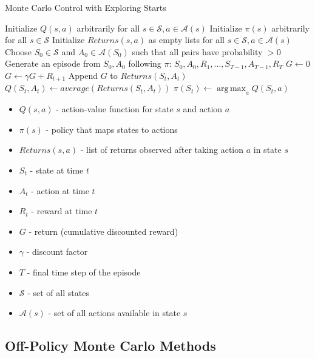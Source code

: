 \documentclass[11pt,a4paper]{article}
\DeclareMathOperator*{\argmax}{arg\,max}
\begin{document}
\begin{algorithm}[H]
\caption{Monte Carlo Control with Exploring Starts}
\begin{algorithmic}[1]
\State Initialize $Q(s, a)$ arbitrarily for all $s \in \mathcal{S}, a \in \mathcal{A}(s)$
\State Initialize $\pi(s)$ arbitrarily for all $s \in \mathcal{S}$
\State Initialize $Returns(s, a)$ as empty lists for all $s \in \mathcal{S}, a \in \mathcal{A}(s)$
    \State Choose $S_0 \in \mathcal{S}$ and $A_0 \in \mathcal{A}(S_0)$ such that all pairs have probability $> 0$
    \State Generate an episode from $S_0, A_0$ following $\pi$: $S_0, A_0, R_1, \ldots, S_{T-1}, A_{T-1}, R_T$
    \State $G \gets 0$
        \State $G \gets \gamma G + R_{t+1}$
            \State Append $G$ to $Returns(S_t, A_t)$
            \State $Q(S_t, A_t) \gets average(Returns(S_t, A_t))$
            \State $\pi(S_t) \gets \argmax_a Q(S_t, a)$
        \EndIf
    \EndFor
\EndFor
\end{algorithmic}
\end{algorithm}

\begin{tcolorbox}[title=Notation Overview]
\begin{itemize}
    \item $Q(s, a)$ - action-value function for state $s$ and action $a$
    \item $\pi(s)$ - policy that maps states to actions
    \item $Returns(s, a)$ - list of returns observed after taking action $a$ in state $s$
    \item $S_t$ - state at time $t$
    \item $A_t$ - action at time $t$
    \item $R_t$ - reward at time $t$
    \item $G$ - return (cumulative discounted reward)
    \item $\gamma$ - discount factor
    \item $T$ - final time step of the episode
    \item $\mathcal{S}$ - set of all states
    \item $\mathcal{A}(s)$ - set of all actions available in state $s$
\end{itemize}
\end{tcolorbox}

\subsection{Off-Policy Monte Carlo Methods}
\end{document}
